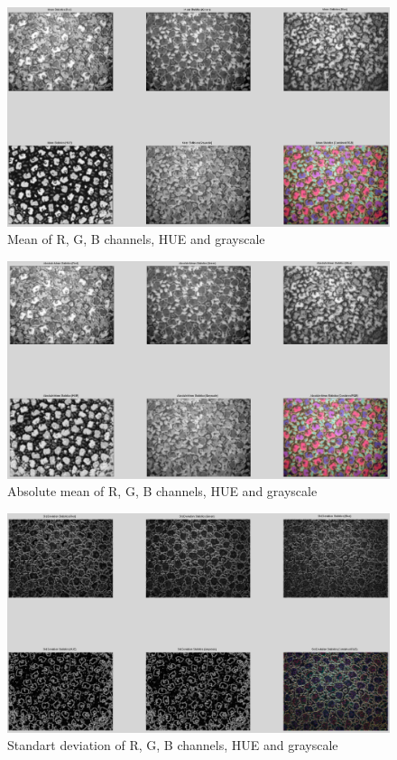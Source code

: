 \documentclass{article}
\begin{document}
\begin{figure}[H]
\begin{center}
\includegraphics[scale=0.3]{meanStatistics.png}
\caption{Mean of R, G, B channels, HUE and grayscale}
\end{center}
\end{figure}	

\begin{figure}[H]
\begin{center}
\includegraphics[scale=0.3]{absoluteMeanStatistics.png}
\caption{Absolute mean of R, G, B channels, HUE and grayscale}
\end{center}
\end{figure}	

\begin{figure}[H]
\begin{center}
\includegraphics[scale=0.3]{standartDeviation.png}
\caption{Standart deviation of R, G, B channels, HUE and grayscale}
\end{center}
\end{figure}	
\end{document}
